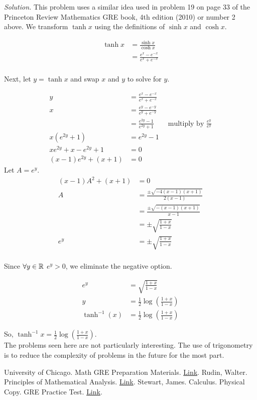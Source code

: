 \textit{Solution.} This problem uses a similar idea used in problem 19 on page 33 of the Princeton Review Mathematics GRE book, 4th edition (2010) or number 2 above. We transform $\tanh x$ using the definitions of $\sinh x$ and $\cosh x$.

\begin{align*}
\tanh x & = \frac{\sinh x}{\cosh x} \\
	  & = \frac{e^x - e^{-x}}{e^x + e^{-x}} \\
\end{align*}

Next, let $y = \tanh x$ and swap $x$ and $y$ to solve for $y$.

\begin{align*}
y & = \frac{e^x - e^{-x}}{e^x + e^{-x}} \\
x & = \frac{e^y - e^{-y}}{e^y + e^{-y}} \\
  & = \frac{e^{2y} - 1}{e^{2y} + 1} \qquad \textrm{multiply by } \frac{e^y}{e^y} \\
x(e^{2y} + 1) & = e^{2y} - 1 \\
xe^{2y} + x - e^{2y} + 1 & = 0 \\
(x - 1)e^{2y} + (x + 1) & = 0
\end{align*}
Let $A = e^y$.
\begin{align*}
(x - 1)A^2 + (x + 1) & = 0 \\
A & = \frac{\pm \sqrt{-4(x - 1)(x + 1)}}{2(x - 1)} \\
  & = \frac{\pm \sqrt{-(x - 1)(x + 1)}}{x - 1} \\
  & = \pm \sqrt{\frac{1 + x}{1 - x}} \\
e^y & = \pm \sqrt{\frac{1 + x}{1 - x}} \\
\end{align*}

Since $\forall y \in \mathbb{R}$ $e^y > 0$, we eliminate the negative option.

\begin{align*}
e^y & = \sqrt{\frac{1 + x}{1 - x}} \\
y & = \frac12 \log\left(\frac{1 + x}{1 - x}\right) \\
\tanh^{-1}(x) & = \frac12 \log\left(\frac{1 + x}{1 - x}\right)
\end{align*}

So, $\boxed{\tanh^{-1}x = \displaystyle\frac12 \log\left(\frac{1 + x}{1 - x}\right)}$. \\

The problems seen here are not particularly interesting. The use of trigonometry is to
reduce the complexity of problems in the future for the most part.
\begin{thebibliography}{9}
	University of Chicago. Math GRE Preparation Materials. \href{https://math.uchicago.edu/~min/GRE/}{Link}.
	Rudin, Walter. Principles of Mathematical Analysis. \href{https://notendur.hi.is/vae11/\%C3\%9Eekking/principles_of_mathematical_analysis_walter_rudin.pdf}{Link}.
	Stewart, James. Calculus. Physical Copy.
	GRE Practice Test. \href{https://www.ets.org/s/gre/pdf/practice_book_math.pdf}{Link}. 
\end{thebibliography}


